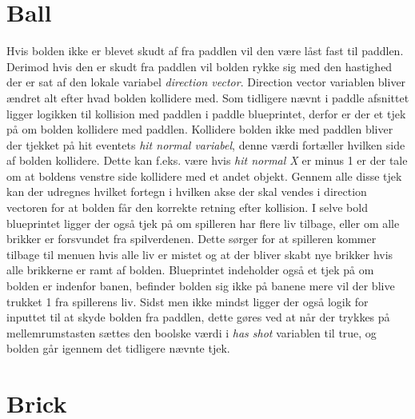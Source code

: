 \section{Ball}
Hvis bolden ikke er blevet skudt af fra paddlen vil den være låst fast til paddlen. Derimod hvis den er skudt fra paddlen vil bolden rykke sig med den hastighed der er sat af den lokale variabel \textit{direction vector}. Direction vector variablen bliver ændret alt efter hvad bolden kollidere med. Som tidligere nævnt i paddle afsnittet ligger logikken til kollision med paddlen i paddle blueprintet, derfor er der et tjek på om bolden kollidere med paddlen. Kollidere bolden ikke med paddlen bliver der tjekket på hit eventets \textit{hit normal variabel}, denne værdi fortæller hvilken side af bolden kollidere. Dette kan f.eks. være hvis \textit{hit normal X} er minus 1 er der tale om at boldens venstre side kollidere med et andet objekt. Gennem alle disse tjek kan der udregnes hvilket fortegn i hvilken akse der skal vendes i direction vectoren for at bolden får den korrekte retning efter kollision. I selve bold blueprintet ligger der også tjek på om spilleren har flere liv tilbage, eller om alle brikker er forsvundet fra spilverdenen. Dette sørger for at spilleren kommer tilbage til menuen hvis alle liv er mistet og at der bliver skabt nye brikker hvis alle brikkerne er ramt af bolden. Blueprintet indeholder også et tjek på om bolden er indenfor banen, befinder bolden sig ikke på banene mere vil der blive trukket 1 fra spillerens liv. Sidst men ikke mindst ligger der også logik for inputtet til at skyde bolden fra paddlen, dette gøres ved at når der trykkes på mellemrumstasten sættes den boolske værdi i \textit{has shot} variablen til true, og bolden går igennem det tidligere nævnte tjek.  

\section{Brick}

